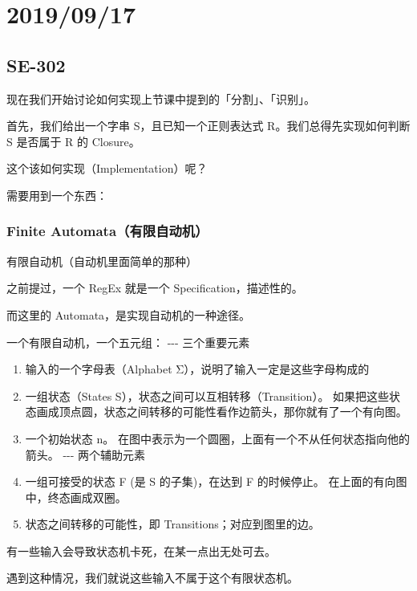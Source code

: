 \documentclass[
]{article}
\date{}
\begin{document}
\hypertarget{header-n0}{%
\section{2019/09/17}\label{header-n0}}

\hypertarget{header-n2}{%
\subsection{SE-302}\label{header-n2}}

现在我们开始讨论如何实现上节课中提到的「分割」、「识别」。

首先，我们给出一个字串 S，且已知一个正则表达式 R。我们总得先实现如何判断
S 是否属于 R 的 Closure。

这个该如何实现（Implementation）呢？

需要用到一个东西：

\hypertarget{header-n7}{%
\subsubsection{Finite Automata（有限自动机）}\label{header-n7}}

有限自动机（自动机里面简单的那种）

之前提过，一个 RegEx 就是一个 Specification，描述性的。

而这里的 Automata，是实现自动机的一种途径。

一个有限自动机，一个五元组： -\/-\/- 三个重要元素

\begin{enumerate}
\def\labelenumi{\arabic{enumi}.}
\item
  输入的一个字母表（Alphabet Σ），说明了输入一定是这些字母构成的
\item
  一组状态（States S），状态之间可以互相转移（Transition）。
  如果把这些状态画成顶点圆，状态之间转移的可能性看作边箭头，那你就有了一个有向图。
\item
  一个初始状态 n。
  在图中表示为一个圆圈，上面有一个不从任何状态指向他的箭头。 -\/-\/-
  两个辅助元素
\item
  一组可接受的状态 F (是 S 的子集)，在达到 F 的时候停止。
  在上面的有向图中，终态画成双圈。
\item
  状态之间转移的可能性，即 Transitions；对应到图里的边。
\end{enumerate}

有一些输入会导致状态机卡死，在某一点出无处可去。

遇到这种情况，我们就说这些输入不属于这个有限状态机。
\end{document}
